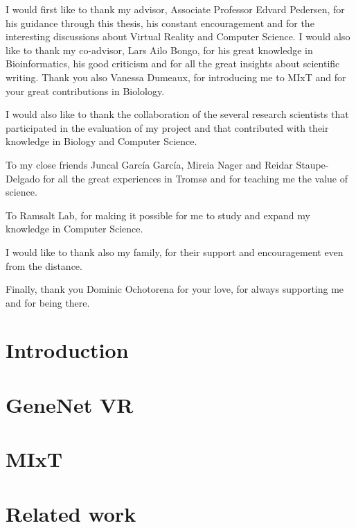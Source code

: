 \documentclass[USenglish]{uit-thesis}
\begin{document}
\begin{acknowledgement}

I would first like to thank my advisor, Associate Professor Edvard Pedersen, for his guidance through this thesis, his constant encouragement and for the interesting discussions about Virtual Reality and Computer Science. I would also like to thank my co-advisor, Lars Ailo Bongo, for his great knowledge in Bioinformatics, his good criticism and for all the great insights about scientific writing. Thank you also Vanessa Dumeaux, for introducing me to MIxT and for your great contributions in Biolology.

I would also like to thank the collaboration of the several research scientists that participated in the evaluation of my project and that contributed with their knowledge in Biology and Computer Science.

To my close friends Juncal García García, Mireia Nager and Reidar Staupe-Delgado for all the great experiences in Tromsø and for teaching me the value of science.

To Ramsalt Lab, for making it possible for me to study and expand my knowledge in Computer Science.

I would like to thank also my family, for their support and encouragement even from the distance.

Finally, thank you Dominic Ochotorena for your love, for always supporting me and for being there.

\end{acknowledgement}

\tableofcontents

\mainmatter

\chapter{Introduction}


\chapter{GeneNet VR}


\chapter{MIxT}


\chapter{Related work}

\end{document}
